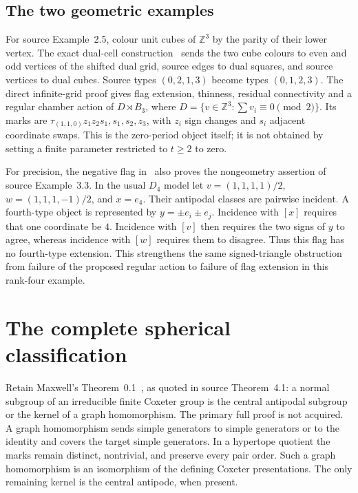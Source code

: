 \documentclass[11pt,a4paper]{article}
\newcommand{\Z}{\mathbb Z}
\begin{document}
\subsection*{The two geometric examples}
For source Example~2.5, colour unit cubes of $\Z^3$ by the parity of their
lower vertex. The exact dual-cell construction~\cite{cubes} sends the two
cube colours to even and odd vertices of the shifted dual grid, source
edges to dual squares, and source vertices to dual cubes. Source types
$(0,2,1,3)$ become types $(0,1,2,3)$. The direct infinite-grid proof gives
flag extension, thinness, residual connectivity and a regular chamber
action of $D\rtimes B_3$, where
$D=\{v\in\Z^3:\sum v_i\equiv0\pmod2\}$. Its marks are
$\tau_{(1,1,0)}z_1z_2s_1,s_1,s_2,z_3$, with $z_i$ sign changes and
$s_i$ adjacent coordinate swaps. This is the zero-period object itself;
it is not obtained by setting a finite parameter restricted to $t\ge2$ to zero.

For precision, the negative flag in~\cite{spherical} also proves the
nongeometry assertion of source Example~3.3. In the usual $D_4$ model
let $v=(1,1,1,1)/2$, $w=(1,1,1,-1)/2$, and $x=e_4$. Their antipodal
classes are pairwise incident. A fourth-type object is represented by
$y=\pm e_i\pm e_j$. Incidence with $[x]$ requires that one coordinate
be $4$. Incidence with $[v]$ then requires the two signs of $y$ to agree,
whereas incidence with $[w]$ requires them to disagree. Thus this flag
has no fourth-type extension. This strengthens the same signed-triangle
obstruction from failure of the proposed regular action to failure of
flag extension in this rank-four example.

\section{The complete spherical classification}\label{sphericalsec}
Retain Maxwell's Theorem~0.1~\cite{Maxwell}, as quoted in source
Theorem~4.1: a normal subgroup of an irreducible finite Coxeter group is
the central antipodal subgroup or the kernel of a graph homomorphism.
The primary full proof is not acquired. A graph homomorphism sends simple
generators to simple generators or to the identity and covers the target
simple generators. In a hypertope quotient the marks remain distinct,
nontrivial, and preserve every pair order. Such a graph homomorphism is
an isomorphism of the defining Coxeter presentations. The only remaining
kernel is the central antipode, when present.
\end{document}
